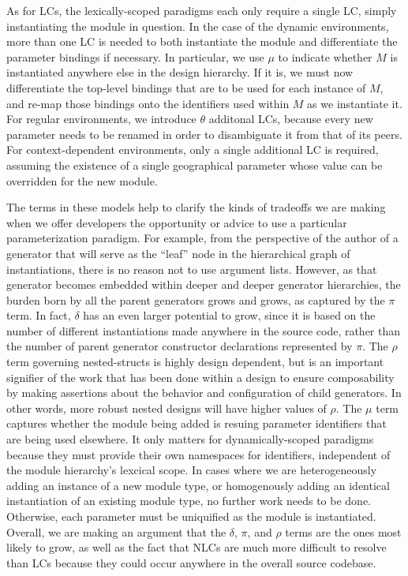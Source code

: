 As for LCs, the lexically-scoped paradigms each only require a single LC, simply instantiating the module in question.
In the case of the dynamic environments, more than one LC is needed to both instantiate the module and differentiate the parameter bindings if necessary.
In particular, we use $\mu$ to indicate whether $M$ is instantiated anywhere else in the design hierarchy.
If it is, we must now differentiate the top-level bindings that are to be used for each instance of $M$, and re-map those bindings onto the identifiers used
within $M$ as we instantiate it.
For regular environments, we introduce $\theta$ additonal LCs, because every new parameter needs to be renamed in order to disambiguate it from that of its peers.
For context-dependent environments, only a single additional LC is required, assuming the existence of a single geographical parameter whose value can be overridden for the new module.

The terms in these models help to clarify the kinds of tradeoffs we are making when we offer developers the opportunity or advice to use a particular parameterization paradigm.
For example, from the perspective of the author of a generator that will serve as the ``leaf'' node in the hierarchical graph of instantiations, there is no reason not to use argument lists.
However, as that generator becomes embedded within deeper and deeper generator hierarchies, the burden born by all the parent generators grows and grows, as captured by the $\pi$ term.
In fact, $\delta$ has an even larger potential to grow, since it is based on the number of different instantiations made anywhere in the source code,
rather than the number of parent generator constructor declarations represented by $\pi$.
The $\rho$ term governing nested-structs is highly design dependent, but is an important signifier of the work that has been done within a design to ensure composability
by making assertions about the behavior and configuration of child generators.
In other words, more robust nested designs will have higher values of $\rho$.
The $\mu$ term captures whether the module being added is resuing parameter identifiers that are being used elsewhere.
It only matters for dynamically-scoped paradigms because they must provide their own namespaces for identifiers, independent of the module hierarchy's lexcical scope.
In cases where we are heterogeneously adding an instance of a new module type, or homogenously adding an identical instantiation of an existing module type, no further work needs to be done.
Otherwise, each parameter must be uniquified as the module is instantiated.
Overall, we are making an argument that the $\delta$, $\pi$, and $\rho$ terms are the ones most likely to grow,
as well as the fact that NLCs are much more difficult to resolve than LCs because they could occur anywhere in the overall source codebase.

